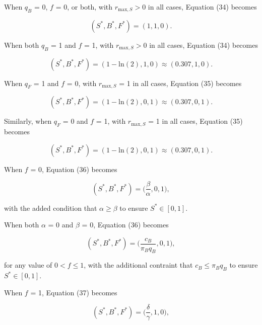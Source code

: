 \documentclass[12pt]{article}
\begin{document}
\noindent When $q_B$ = 0, $f$ = 0, or both, with $r_{\mathrm{max}, S} > 0$ in all cases, Equation (34) becomes

\begin{equation}
(S^*, B^*, F^*) = (1, 1, 0).
\end{equation}

\noindent When both $q_B$ = 1 and $f$ = 1, with $r_{\mathrm{max}, S} > 0$ in all cases, Equation (34) becomes

\begin{equation}
(S^*, B^*, F^*) = (1 - \mathrm{ln}(2), 1, 0) \approx (0.307, 1, 0).
\end{equation}

\noindent When $q_F$ = 1 and $f$ = 0, with $r_{\mathrm{max}, S}$ = 1 in all cases, Equation (35) becomes

\begin{equation}
(S^*, B^*, F^*) = (1 - \mathrm{ln}(2), 0, 1) \approx (0.307, 0, 1).
\end{equation}

\noindent Similarly, when $q_F$ = 0 and $f$ = 1, with $r_{\mathrm{max}, S}$ = 1 in all cases, Equation (35) becomes

\begin{equation}
(S^*, B^*, F^*) = (1 - \mathrm{ln}(2), 0, 1) \approx (0.307, 0, 1).
\end{equation}

\noindent When $f$ = 0, Equation (36) becomes

\begin{equation}
(S^*, B^*, F^*) = \Big(\frac{\beta}{\alpha}, 0, 1\Big),
\end{equation}

\noindent with the added condition that $\alpha \geq \beta$ to ensure $S^* \in [0, 1]$.

\noindent When both $\alpha$ = 0 and $\beta$ = 0, Equation (36) becomes

\begin{equation}
(S^*, B^*, F^*) = \Big(\frac{c_B}{\pi_Bq_B}, 0, 1\Big),
\end{equation}

\noindent for any value of $0 < f \leq 1$, with the additional contraint that $c_B \leq \pi_B q_B$ to ensure $S^* \in [0, 1]$.

\noindent When $f$ = 1, Equation (37) becomes

\begin{equation}
(S^*, B^*, F^*) = \Big(\frac{\delta}{\gamma}, 1, 0\Big),
\end{equation}
\end{document}
